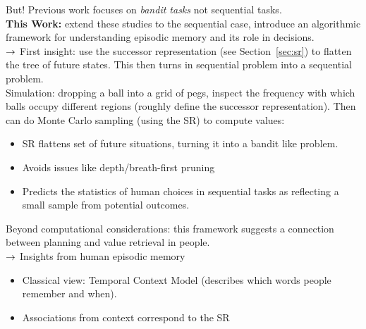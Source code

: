 But! Previous work focuses on {\it bandit tasks} not sequential tasks. \\

{\bf This Work:} extend these studies to the sequential case, introduce an algorithmic framework for understanding episodic memory and its role in decisions. \\

$\rightarrow$ First insight: use the successor representation (see Section~\ref{sec:sr}) to flatten the tree of future states. This then turns in sequential problem into a sequential problem. \\

Simulation: dropping a ball into a grid of pegs, inspect the frequency with which balls occupy different regions (roughly define the successor representation). Then can do Monte Carlo sampling (using the SR) to compute values:
\begin{itemize}
    \item SR flattens set of future situations, turning it into a bandit like problem.
    \item Avoids issues like depth/breath-first pruning
    \item Predicts the statistics of human choices in sequential tasks as reflecting a small sample from potential outcomes.
\end{itemize}

Beyond computational considerations: this framework suggests a connection between planning and value retrieval in people.\\

$\rightarrow$ Insights from human episodic memory
\begin{itemize}
    \item Classical view: Temporal Context Model (describes which words people remember and when).
    
    \item Associations from context correspond to the SR~\cite{gershman2012successor}
\end{itemize}

